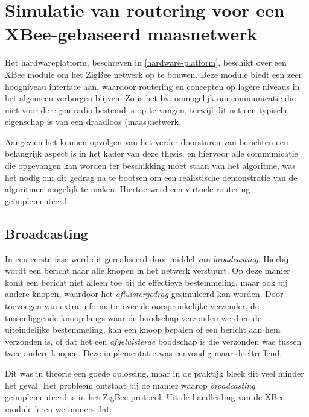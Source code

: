 
\chapter{Simulatie van routering voor een XBee-gebaseerd maasnetwerk}
\label{virtual-mesh}

Het hardwareplatform, beschreven in \ref{hardware-platform}, beschikt over een
XBee module om het ZigBee netwerk op te bouwen. Deze module biedt een zeer
hoogniveau interface aan, waardoor routering en concepten op lagere niveaus in
het algemeen verborgen blijven. Zo is het bv. onmogelijk om communicatie die
niet voor de eigen radio bestemd is op te vangen, terwijl dit net een typische
eigenschap is van een draadloos (maas)netwerk.

Aangezien het kunnen opvolgen van het verder doorsturen van berichten een
belangrijk aspect is in het kader van deze thesis, en hiervoor alle
communicatie die opgevangen kan worden ter beschikking moet staan van het
algoritme, was het nodig om dit gedrag na te bootsen om een realistische
demonstratie van de algoritmen mogelijk te maken. Hiertoe werd een virtuele
routering ge\"implementeerd.

\section{Broadcasting}
\label{zigbee-broadcasting}

In een eerste fase werd dit gerealiseerd door middel van \emph{broadcasting}.
Hierbij wordt een bericht naar alle knopen in het netwerk verstuurt. Op deze
manier komt een bericht niet alleen toe bij de effectieve bestemmeling, maar
ook bij andere knopen, waardoor het \emph{afluistergedrag} gesimuleerd kan
worden. Door toevoegen van extra informatie over de oorspronkelijke verzender,
de tussenliggende knoop langs waar de boodschap verzonden werd en de
uiteindelijke bestemmeling, kan een knoop bepalen of een bericht aan hem
verzonden is, of dat het een \emph{afgeluisterde} boodschap is die verzonden
was tussen twee andere knopen. Deze implementatie was eenvoudig maar
doeltreffend.

Dit was in theorie een goede oplossing, maar in de praktijk bleek dit veel
minder het geval. Het probleem ontstaat bij de manier waarop
\emph{broadcasting} ge\"implementeerd is in het ZigBee protocol. Uit de
handleiding van de XBee module \citep{manual:xbee} leren we immers dat:

